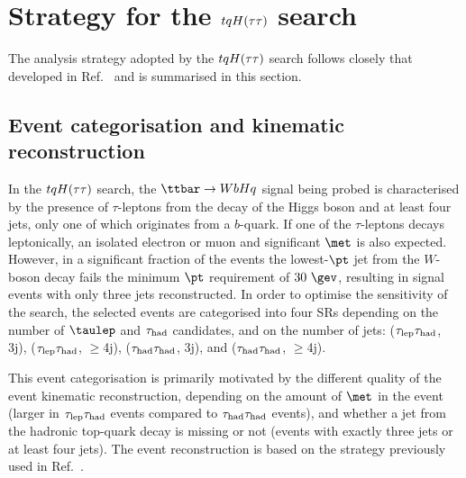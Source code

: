 \section{Strategy for the $tqH(\tau\tau)$ search}
\label{sec:strategy_Htautau}

The analysis strategy adopted by the $tqH(\tau\tau)$ search follows closely that developed in Ref.~\cite{Chen:2015nta} and is summarised in this section.

\subsection{Event categorisation and kinematic reconstruction}
\label{sec:htautau_reco_cat}

In the $tqH(\tau\tau)$ search, the $\ttbar \to WbHq$ signal being probed is characterised by the presence of $\tau$-leptons from the decay of 
the Higgs boson and at least four jets, only one of which originates from a $b$-quark.
If one of the $\tau$-leptons decays leptonically, an isolated electron or muon and significant $\met$ is also expected.
However, in a significant fraction of the events the lowest-$\pt$ jet from the $W$-boson decay fails the minimum $\pt$ requirement of $30~\gev$,
resulting in signal events with only three jets reconstructed.
In order to optimise the sensitivity of the search, the selected events are categorised into four SRs depending 
on the number of $\taulep$ and $\tau_{\mathrm{had}}$ candidates, and on the number of jets:
($\tau_{\mathrm{lep}} \tau_{\mathrm{had}}$, 3j), ($\tau_{\mathrm{lep}} \tau_{\mathrm{had}}$, $\geq$4j), ($\tau_{\mathrm{had}} \tau_{\mathrm{had}}$, 3j), and ($\tau_{\mathrm{had}} \tau_{\mathrm{had}}$, $\geq$4j). 

This event categorisation is primarily motivated by the different quality of the event kinematic reconstruction, depending on the amount 
of $\met$ in the event (larger in $\tau_{\mathrm{lep}} \tau_{\mathrm{had}}$ events compared to $\tau_{\mathrm{had}} \tau_{\mathrm{had}}$ events), and whether a jet from the hadronic top-quark decay 
is missing or not (events with exactly three jets or at least four jets).
The event reconstruction is based on the strategy previously used in Ref.~\cite{Chen:2015nta}.

